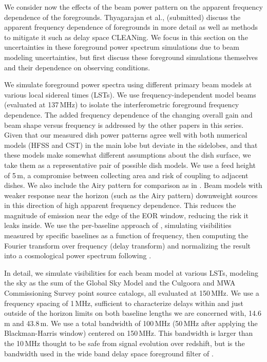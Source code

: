 \documentclass{emulateapj}
\begin{document}
We consider now the effects of the beam power pattern on the apparent frequency dependence of the foregrounds. Thyagarajan et al., (submitted) discuss the apparent frequency dependence of foregrounds in more detail as well as methods to mitigate it such as delay space CLEANing. We focus in this section on the uncertainties in these foreground power spectrum simulations due to beam modeling uncertainties, but first discuss these foreground simulations themselves and their dependence on observing conditions. 

We simulate foreground power spectra using different primary beam models at various local sidereal times (LSTs). We use frequency-independent model beams (evaluated at 137\,MHz) to isolate the interferometric foreground frequency dependence. The added frequency dependence of the changing overall gain and beam shape versus frequency is addressed by the other papers in this series. Given that our measured dish power patterns agree well with both numerical models (HFSS and CST) in the main lobe but deviate in the sidelobes, and that these models make somewhat different assumptions about the dish surface, we take them as a representative pair of possible dish models. We use a feed height of 5\,m, a compromise between collecting area and risk of coupling to adjacent dishes. We also include the Airy pattern for comparison as in \citet{nithya15}. Beam models with weaker response near the horizon (such as the Airy pattern) downweight sources in this direction of high apparent frequency dependence. This reduces the magnitude of emission near the edge of the EOR window, reducing the risk it leaks inside. We use the per-baseline approach of \citet{parsons12a,parsons12b}, simulating visibilities measured by specific baselines as a function of frequency, then computing the Fourier transform over frequency (delay transform) and normalizing the result into a cosmological power spectrum following \citet{nithya15}. 

In detail, we simulate visibilities for each beam model at various LSTs, modeling the sky as the sum of the Global Sky Model \citep{gsm} and the Culgoora \citep{Slee1995} and MWA Commissioning Survey \citep{MWACS} point source catalogs, all evaluated at 150\,MHz. We use a frequency spacing of 1\,MHz, sufficient to characterize delays within and just outside of the horizon limits on both baseline lengths we are concerned with, 14.6\,m and 43.8\,m. We use a total bandwidth of 100\,MHz (50\,MHz after applying the Blackman-Harris window) centered on 150\,MHz. This bandwidth is larger than the 10\,MHz thought to be safe from signal evolution over redshift, but is the bandwidth used in the wide band delay space foreground filter of \citet{paper32,paper64}.
\end{document}
